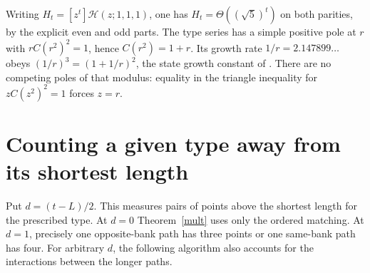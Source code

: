 \documentclass[11pt]{article}
\newcommand{\mH}{\mathcal H}
\begin{document}
Writing \(H_t=[z^t]\mH(z;1,1,1)\), one has \(H_t=\Theta((\sqrt5)^t)\) on both parities, by the explicit even and odd parts. The type series has a simple positive pole at \(r\) with \(rC(r^2)^2=1\), hence \(C(r^2)=1+r\). Its growth rate \(1/r=2.147899\ldots\) obeys \((1/r)^3=(1+1/r)^2\), the state growth constant of \cite[Eq.~(3.12)]{dfgj}. There are no competing poles of that modulus: equality in the triangle inequality for \(zC(z^2)^2=1\) forces \(z=r\).

\newpage
\section{Counting a given type away from its shortest length}
Put \(d=(t-L)/2\). This measures pairs of points above the shortest length for the prescribed type. At \(d=0\) Theorem~\ref{mult} uses only the ordered matching. At \(d=1\), precisely one opposite-bank path has three points or one same-bank path has four. For arbitrary \(d\), the following algorithm also accounts for the interactions between the longer paths.
\end{document}
